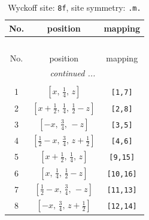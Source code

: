 \documentclass[fleqn,8pt]{jsarticle}
\begin{document}
\begin{longtable}{ccc}
\caption{Wyckoff site: {\tt 8f}, site symmetry: {\tt .m.}}
 \\
 \hline \hline
No. & position & mapping \\ \hline \endfirsthead

\multicolumn{2}{l}{\tablename\ \thetable{}} \\
 \hline \hline
No. & position & mapping \\ \hline \endhead

 \hline \hline
\multicolumn{2}{r}{\footnotesize\it continued ...} \\ \endfoot

 \hline \hline
\multicolumn{2}{r}{} \\ \endlastfoot

1 & $\left[ x,\, \frac{1}{4},\, z \right]$ & {\tt [1,7]} \\ \hline
2 & $\left[ x + \frac{1}{2},\, \frac{1}{4},\, \frac{1}{2} - z \right]$ & {\tt [2,8]} \\ \hline
3 & $\left[ - x,\, \frac{3}{4},\, - z \right]$ & {\tt [3,5]} \\ \hline
4 & $\left[ \frac{1}{2} - x,\, \frac{3}{4},\, z + \frac{1}{2} \right]$ & {\tt [4,6]} \\ \hline
5 & $\left[ x + \frac{1}{2},\, \frac{1}{4},\, z \right]$ & {\tt [9,15]} \\ \hline
6 & $\left[ x,\, \frac{1}{4},\, \frac{1}{2} - z \right]$ & {\tt [10,16]} \\ \hline
7 & $\left[ \frac{1}{2} - x,\, \frac{3}{4},\, - z \right]$ & {\tt [11,13]} \\ \hline
8 & $\left[ - x,\, \frac{3}{4},\, z + \frac{1}{2} \right]$ & {\tt [12,14]} \\
\end{longtable}
\renewcommand{\arraystretch}{1.2}
\end{document}
